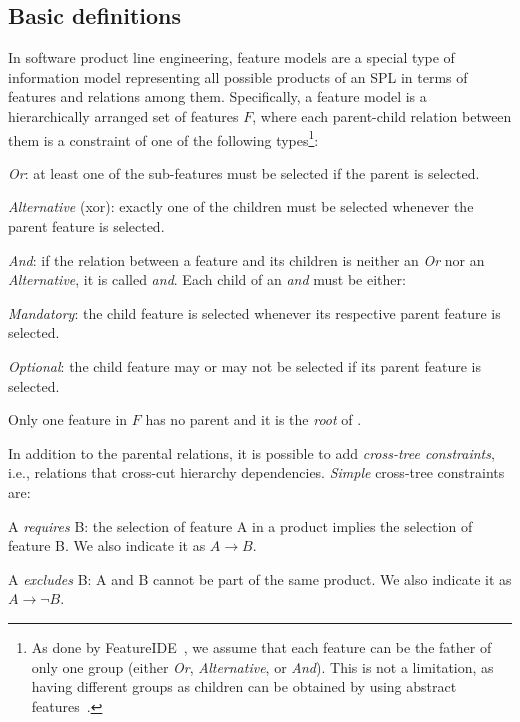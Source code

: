 \begin{tikzborder}{\cite{Gargantini16:validation}}
\begin{tikzborder}{\cite{gargantini_combinatorial_2017}}
\begin{tikzborder}{\cite{garn2019}}
\subsection{Basic definitions}\label{sec:basicDef}

\begin{tikzborder}{\cite{arcaini2019achieving}}
	In software product line engineering, feature models are a special type of information model representing all possible products of an SPL in terms of features and relations among them. Specifically, a feature model \fm is a hierarchically arranged set of features $F$, where each parent-child relation between them is a constraint of one of the following types\footnote{As done by FeatureIDE~\cite{FeatureIDEbook}, we assume that each feature can be the father of only one group (either {\it Or}, {\it Alternative}, or {\it And}). This is not a limitation, as having different groups as children can be obtained by using abstract features~\cite{thum_abstract_2011}.}:
	\begin{compactitem}
		\item \textit{Or}: at least one of the sub-features must be selected if the parent is selected.
		\item \textit{Alternative} (xor): exactly one of the children must be selected whenever the parent feature is selected.
		\item \textit{And}: if the relation between a feature and its children is neither an \textit{Or} nor an \textit{Alternative}, it is called \textit{and}. Each child of an \textit{and} must be either:
		\begin{compactitem}
			\item \textit{Mandatory}: the child feature is selected whenever its respective parent feature is selected.
			\item \textit{Optional}: the child feature may or may not be selected if its parent feature is selected.
		\end{compactitem}
	\end{compactitem}
	
	Only one feature in $F$ has no parent and it is the \emph{root} of \fm.
	
	In addition to the parental relations, it is possible to add \emph{cross-tree constraints}, i.e., relations that cross-cut hierarchy dependencies. {\it Simple} cross-tree constraints are:
	\begin{compactitem}
		\item A {\it requires} B: the selection of feature A in a product implies the selection of feature B. We also indicate it as $A \rightarrow B$.
		\item A {\it excludes} B: A and B cannot be part of the same product. We also indicate it as $A \rightarrow \neg B$.
	\end{compactitem}
	

\end{tikzborder}
\end{tikzborder}
\end{tikzborder}
\end{tikzborder}
